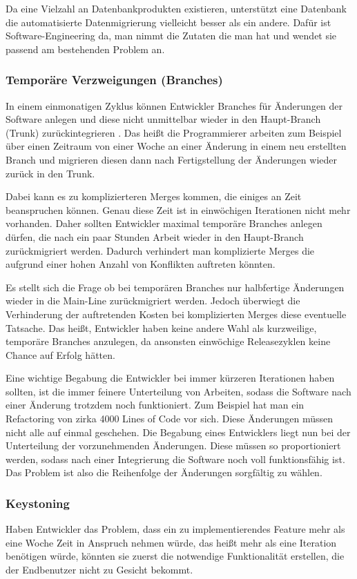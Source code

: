 Da eine Vielzahl an Datenbankprodukten existieren, unterstützt eine Datenbank die automatisierte Datenmigrierung vielleicht besser als ein andere. Dafür ist Software-Engineering da, man nimmt die Zutaten die man hat und wendet sie passend am bestehenden Problem an.

\subsubsection{Temporäre Verzweigungen (Branches)}
In einem einmonatigen Zyklus können Entwickler Branches für Änderungen der Software anlegen und diese nicht unmittelbar wieder in den Haupt-Branch (Trunk) zurückintegrieren \cite{dpunktkonfig2008}. Das heißt die Programmierer arbeiten zum Beispiel über einen Zeitraum von einer Woche an einer Änderung in einem neu erstellten Branch und migrieren diesen dann nach Fertigstellung der Änderungen wieder zurück in den Trunk. 

Dabei kann es zu komplizierteren Merges kommen, die einiges an Zeit beanspruchen können. Genau diese Zeit ist in einwöchigen Iterationen nicht mehr vorhanden. Daher sollten Entwickler maximal temporäre Branches anlegen dürfen, die nach ein paar Stunden Arbeit wieder in den Haupt-Branch zurückmigriert werden. Dadurch verhindert man komplizierte Merges die aufgrund einer hohen Anzahl von Konflikten auftreten könnten. 

Es stellt sich die Frage ob bei temporären Branches nur halbfertige Änderungen wieder in die Main-Line zurückmigriert werden. Jedoch überwiegt die Verhinderung der auftretenden Kosten bei komplizierten Merges diese eventuelle Tatsache. Das heißt, Entwickler haben keine andere Wahl als kurzweilige, temporäre Branches anzulegen, da ansonsten einwöchige Releasezyklen keine Chance auf Erfolg hätten. 

Eine wichtige Begabung die Entwickler bei immer kürzeren Iterationen haben sollten, ist die immer feinere Unterteilung von Arbeiten, sodass die Software nach einer Änderung trotzdem noch funktioniert. Zum Beispiel hat man ein Refactoring von zirka 4000 Lines of Code vor sich. Diese Änderungen müssen nicht alle auf einmal geschehen. Die Begabung eines Entwicklers liegt nun bei der Unterteilung der vorzunehmenden Änderungen. Diese müssen so proportioniert werden, sodass nach einer Integrierung die Software noch voll funktionsfähig ist. Das Problem ist also die Reihenfolge der Änderungen sorgfältig zu wählen.

\subsubsection{Keystoning}
Haben Entwickler das Problem, dass ein zu implementierendes Feature mehr als eine Woche Zeit in Anspruch nehmen würde, das heißt mehr als eine Iteration benötigen würde, könnten sie zuerst die notwendige Funktionalität erstellen, die der Endbenutzer nicht zu Gesicht bekommt. 

